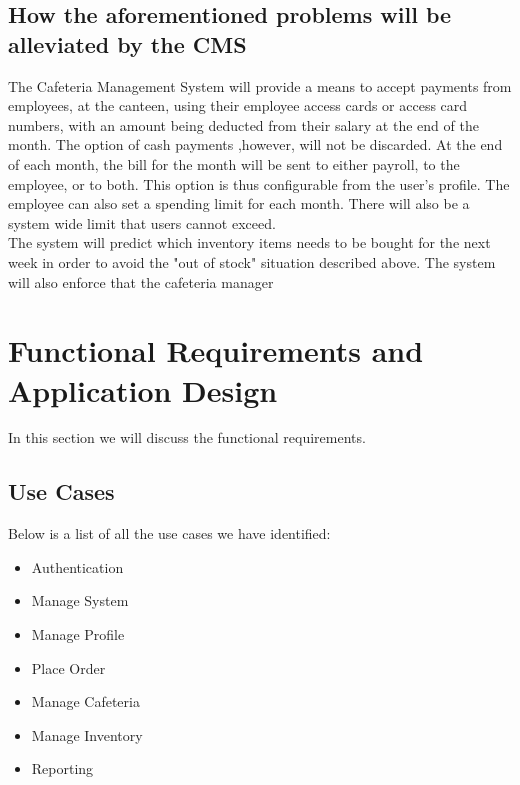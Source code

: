 \documentclass[a4paper,12pt]{report}
\begin{document}
\subsection{How the aforementioned problems will be alleviated by the CMS}
The Cafeteria Management System will provide a means to accept payments from employees, at the canteen, using their employee access cards or access card numbers, with an amount being deducted from their salary at the end of the month.  The option of cash payments ,however, will not be discarded. At the end of each month, the bill for the month will be sent to either payroll, to the employee, or to both. This option is thus configurable from the user's profile. The employee can also set a spending limit for each month. There will also be a system wide limit that users cannot exceed.
\\
The system will predict which inventory items needs to be bought for the next week in order to avoid the "out of stock" situation described above. The system will also enforce that the cafeteria manager 
\\
\section{Functional Requirements and Application Design}
In this section we will discuss the functional requirements. \\

\subsection{Use Cases }
Below is a list of all the use cases we have identified:

\begin{itemize}

\item Authentication
\item Manage System
\item Manage Profile
\item Place Order
\item Manage Cafeteria
\item Manage Inventory 
\item Reporting

\end{itemize}


\end{document}
